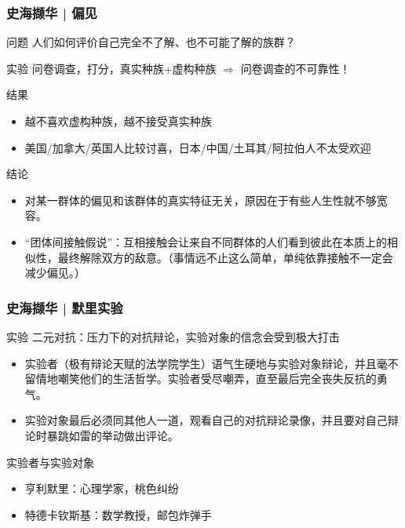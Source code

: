 \begin{frame}
  \frametitle{史海撷华 | 偏见}
  \vspace{-0.7em}
  \begin{block}{问题}
    人们如何评价自己完全不了解、也不可能了解的族群？
  \end{block}
  \vspace{-0.7em}
  \pause
  \begin{block}{实验}
    问卷调查，打分，真实种族+虚构种族 $\Longrightarrow$ \alert{问卷调查的不可靠性！}
  \end{block}
  \vspace{-0.7em}
  \pause
  \begin{block}{结果}
    \begin{itemize}
      \item 越不喜欢虚构种族，越不接受真实种族
      \item 美国/加拿大/英国人比较讨喜，日本/中国/土耳其/阿拉伯人不太受欢迎
    \end{itemize}
  \end{block}
  \vspace{-0.7em}
  \pause
  \begin{block}{结论}
    \begin{itemize}
      \item 对某一群体的偏见和该群体的真实特征无关，原因在于有些人生性就不够宽容。
      \item “团体间接触假说”：互相接触会让来自不同群体的人们看到彼此在本质上的相似性，最终解除双方的敌意。（事情远不止这么简单，单纯依靠接触不一定会减少偏见。）
    \end{itemize}
  \end{block}
\end{frame}

\begin{frame}
  \frametitle{史海撷华 | 默里实验}
  \begin{block}{实验}
    二元对抗：压力下的对抗辩论，实验对象的信念会受到极大打击
    \begin{itemize}
      \item 实验者（极有辩论天赋的法学院学生）语气生硬地与实验对象辩论，并且毫不留情地嘲笑他们的生活哲学。实验者受尽嘲弄，直至最后完全丧失反抗的勇气。
      \item 实验对象最后必须同其他人一道，观看自己的对抗辩论录像，并且要对自己辩论时暴跳如雷的举动做出评论。
    \end{itemize}
  \end{block}
  \pause
  \begin{block}{实验者与实验对象}
    \begin{itemize}
      \item 亨利\textbullet 默里：心理学家，桃色纠纷
      \item 特德\textbullet 卡钦斯基：数学教授，邮包炸弹手
    \end{itemize}
  \end{block}
\end{frame}

